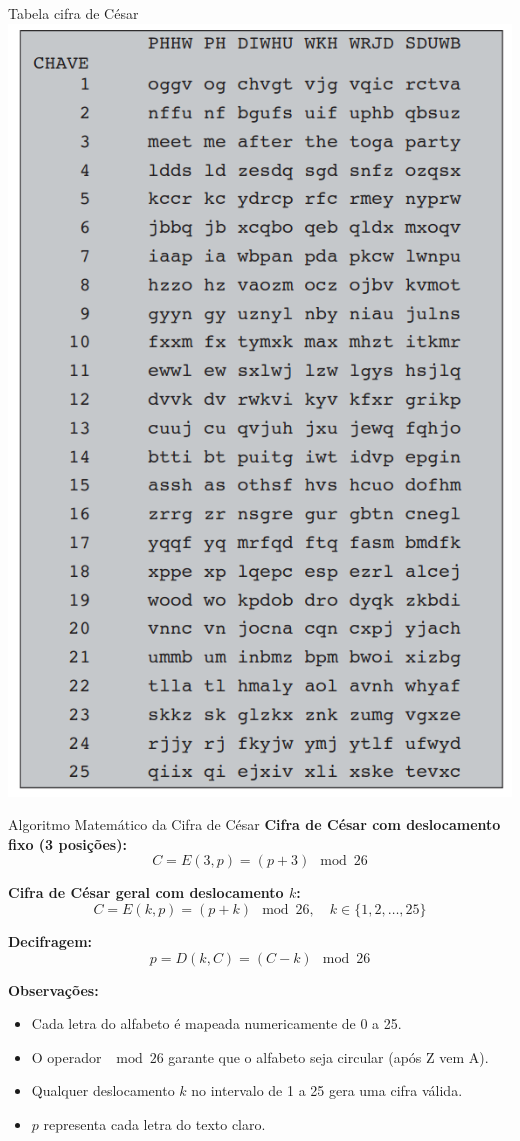 \begin{frame}{Tabela cifra de César}
    \centering
    \includegraphics[width=0.35\linewidth]{Figuras/tabela-cifra-cesar.png}


\end{frame}

\begin{frame}{Algoritmo Matemático da Cifra de César}
\textbf{Cifra de César com deslocamento fixo (3 posições):}  
\[
C = E(3, p) = (p + 3) \mod 26
\]

\textbf{Cifra de César geral com deslocamento \(k\):}  
\[
C = E(k, p) = (p + k) \mod 26, \quad k \in \{1, 2, \dots, 25\}
\]

\textbf{Decifragem:}  
\[
p = D(k, C) = (C - k) \mod 26
\]

\medskip
\textbf{Observações:}  
\begin{itemize}
    \item Cada letra do alfabeto é mapeada numericamente de 0 a 25.  
    \item O operador \(\mod 26\) garante que o alfabeto seja circular (após Z vem A).  
    \item Qualquer deslocamento \(k\) no intervalo de 1 a 25 gera uma cifra válida.
    \item \(p\) representa cada letra do texto claro.
\end{itemize}
\end{frame}

